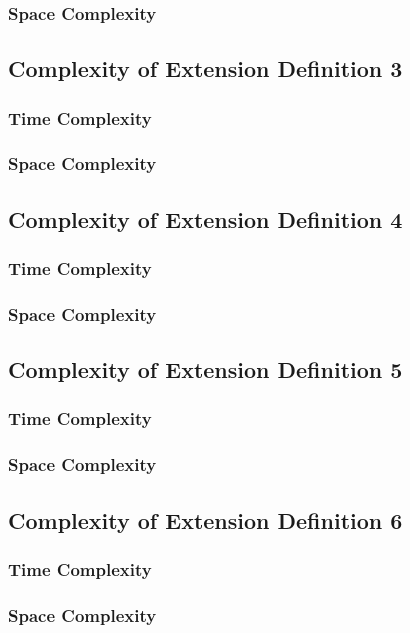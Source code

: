 \documentclass[conference]{IEEEtran}
\begin{document}
\subsubsection{Space Complexity}

\subsection{Complexity of Extension Definition 3}

\subsubsection{Time Complexity}

\subsubsection{Space Complexity}

\subsection{Complexity of Extension Definition 4}

\subsubsection{Time Complexity}

\subsubsection{Space Complexity}

\subsection{Complexity of Extension Definition 5}

\subsubsection{Time Complexity}

\subsubsection{Space Complexity}

\subsection{Complexity of Extension Definition 6}

\subsubsection{Time Complexity}

\subsubsection{Space Complexity}


\end{document}
